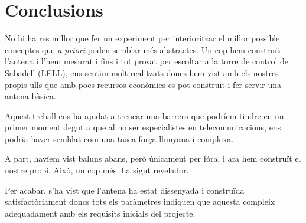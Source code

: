 \chapter{Conclusions}

No hi ha res millor que fer un experiment per interioritzar el millor possible conceptes que \textit{a priori} poden semblar més abstractes. Un cop hem construït l'antena i l'hem mesurat i fins i tot provat per escoltar a la torre de control de Sabadell (LELL), ens sentim molt realitzats doncs hem vist amb els nostres propis ulls que amb pocs recursos econòmics es pot construït i fer servir una antena bàsica.

Aquest treball ens ha ajudat a trencar una barrera que podríem tindre en un primer moment degut a que al no ser especialistes en telecomunicacions, ens podria haver semblat com una tasca força llunyana i complexa.

A part, havíem vist baluns abans, però únicament per fóra, i ara hem construït el nostre propi. Això, un cop més, ha sigut revelador. 

Per acabar, s'ha vist que l'antena ha estat dissenyada i construïda satisfactòriament doncs tots els paràmetres indiquen que aquesta compleix adequadament amb els requisits inicials del projecte.